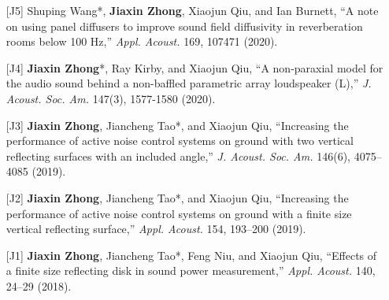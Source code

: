 \documentclass[10pt,a4paper,ragged2e,withhyper]{altacv}
\newcommand{\PubJournal}[1]{\textit{#1}}
\newcommand{\PubTitle}[1]{``{#1,}''}
\newcommand{\PubCorAuthor}[1]{#1*}
\begin{document}
\begin{itemize}[leftmargin = 30pt]
    \item[{[J5]}] \PubCorAuthor{Shuping Wang}, \textbf{Jiaxin Zhong}, Xiaojun Qiu, and Ian Burnett, 
        \PubTitle{A note on using panel diffusers to improve sound field diffusivity in reverberation rooms below 100 Hz}
    \PubJournal{Appl. Acoust.} 
    169, 107471 (2020).
        \href{https://doi.org/10.1016/j.apacoust.2020.107471}{\color{accent}\aiDoi}
        \href{https://github.com/JiaxinZhong/JiaxinZhong.github.io/raw/master/publications/journal/Wang2020-AA-Diffuser.pdf}{\color{accent}\faFilePdf[regular]}

    \item[{[J4]}] \PubCorAuthor{\textbf{Jiaxin Zhong}}, Ray Kirby, and Xiaojun Qiu,
        \PubTitle{A non-paraxial model for the audio sound behind a non-baffled parametric array loudspeaker (L)}
        \PubJournal{J. Acoust. Soc. Am.}
        147(3), 1577-1580 (2020).
        \href{https://doi.org/10.1121/10.0000793}{\color{accent}\aiDoi}
        \href{https://github.com/JiaxinZhong/JiaxinZhong.github.io/raw/master/publications/journal/Zhong2020-JASA-PAL_disk.pdf}{\color{accent}\faFilePdf[regular]}

    \item[{[J3]}] \textbf{Jiaxin Zhong}, \PubCorAuthor{Jiancheng Tao}, and Xiaojun Qiu, 
        \PubTitle{Increasing the performance of active noise control systems on ground with two vertical reflecting surfaces with an included angle} 
        \PubJournal{J. Acoust. Soc. Am.}
        146(6), 4075--4085 (2019).
        \href{https://doi.org/10.1121/1.5134062}{\color{accent}\aiDoi}
        \href{https://github.com/JiaxinZhong/JiaxinZhong.github.io/raw/master/publications/journal/Zhong2019-JASA-ANC_surface_included_angle.pdf}{\color{accent}\faFilePdf[regular]}

    \item[{[J2]}] \textbf{Jiaxin Zhong}, \PubCorAuthor{Jiancheng Tao}, and Xiaojun Qiu,
        \PubTitle{Increasing the performance of active noise control systems on ground with a finite size vertical reflecting surface}
        \PubJournal{Appl. Acoust.} 
        154, 193--200 (2019).
        \href{https://doi.org/10.1016/j.apacoust.2019.05.002}{\color{accent}\aiDoi}
        \href{https://github.com/JiaxinZhong/JiaxinZhong.github.io/raw/master/publications/journal/Zhong2019-AA-ANC_finite_size_surface.pdf}{\color{accent}\faFilePdf[regular]}

    \item[{[J1]}] \textbf{Jiaxin Zhong}, \PubCorAuthor{Jiancheng Tao}, Feng Niu, and Xiaojun Qiu,
        \PubTitle{Effects of a finite size reflecting disk in sound power measurement}
        \PubJournal{Appl. Acoust.}
        140, 24--29 (2018).
        \href{https://doi.org/10.1016/j.apacoust.2018.05.007}{\color{accent}\aiDoi}
        \href{https://github.com/JiaxinZhong/JiaxinZhong.github.io/raw/master/publications/journal/Zhong2018-AA-Sound_power.pdf}{\color{accent}\faFilePdf[regular]}
\end{itemize}
\end{document}
